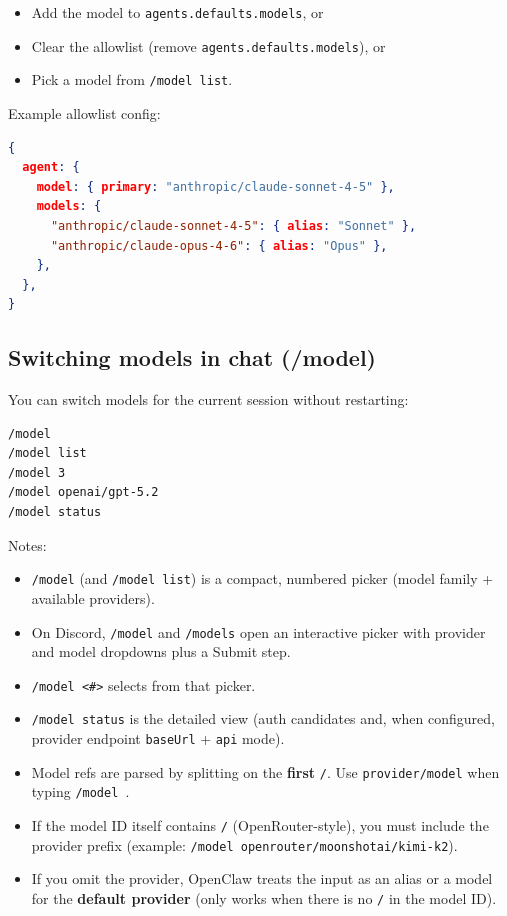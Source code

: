\begin{itemize}
  \item Add the model to \texttt{agents.defaults.models}, or
  \item Clear the allowlist (remove \texttt{agents.defaults.models}), or
  \item Pick a model from \texttt{/model list}.
\end{itemize}


Example allowlist config:

\begin{lstlisting}[language=json]
{
  agent: {
    model: { primary: "anthropic/claude-sonnet-4-5" },
    models: {
      "anthropic/claude-sonnet-4-5": { alias: "Sonnet" },
      "anthropic/claude-opus-4-6": { alias: "Opus" },
    },
  },
}
\end{lstlisting}


\subsection{Switching models in chat (/model)}


You can switch models for the current session without restarting:

\begin{lstlisting}
/model
/model list
/model 3
/model openai/gpt-5.2
/model status
\end{lstlisting}


Notes:

\begin{itemize}
  \item \texttt{/model} (and \texttt{/model list}) is a compact, numbered picker (model family + available providers).
  \item On Discord, \texttt{/model} and \texttt{/models} open an interactive picker with provider and model dropdowns plus a Submit step.
  \item \texttt{/model <\#>} selects from that picker.
  \item \texttt{/model status} is the detailed view (auth candidates and, when configured, provider endpoint \texttt{baseUrl} + \texttt{api} mode).
  \item Model refs are parsed by splitting on the \textbf{first} \texttt{/}. Use \texttt{provider/model} when typing \texttt{/model }.
  \item If the model ID itself contains \texttt{/} (OpenRouter-style), you must include the provider prefix (example: \texttt{/model openrouter/moonshotai/kimi-k2}).
  \item If you omit the provider, OpenClaw treats the input as an alias or a model for the \textbf{default provider} (only works when there is no \texttt{/} in the model ID).
\end{itemize}


